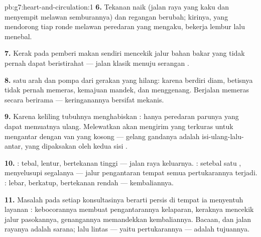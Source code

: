 \begin{solution}{pb:g7:heart-and-circulation:1}
\textbf{6.} Tekanan  naik (jalan raya yang kaku dan menyempit
melawan semburannya) dan regangan   berubah; 
kirinya, yang mendorong tiap ronde melawan peredaran yang mengaku,
bekerja lembur lalu menebal.

\textbf{7.} Kerak pada  pemberi makan  sendiri
mencekik jalur bahan bakar  yang tidak pernah dapat beristirahat
--- jalan klasik menuju serangan .

\textbf{8.}  satu arah  dan pompa  dari gerakan yang
hilang: karena berdiri diam, betisnya tidak pernah memeras,
kemajuan  mandek, dan  menggenang.
Berjalan memeras  secara berirama --- keringanannya bersifat
mekanis.

\textbf{9.} Karena keliling tubuhnya menghabiskan  :
hanya peredaran parunya yang dapat memuatnya ulang. Melewatkan
 akan mengirim  yang terkuras untuk mengantar dengan
van yang kosong --- gelang gandanya adalah isi-ulang-lalu-antar, yang
dipaksakan oleh kedua sisi .

\textbf{10.} : tebal, lentur, bertekanan tinggi --- jalan raya
keluarnya. : setebal satu , menyelusupi segalanya --- jalur
pengantaran tempat semua pertukarannya terjadi. : lebar, berkatup,
bertekanan rendah --- kembaliannya.

\textbf{11.} Masalah pada setiap konsultasinya berarti persis di
tempat ia menyentuh layanan : kebocorannya membuat
pengantarannya kelaparan, keraknya mencekik jalur pasokannya,
genangannya memandekkan kembaliannya. Bacaan,  dan jalan rayanya
adalah sarana; lalu lintas  --- yaitu pertukarannya ---
adalah tujuannya.


\end{solution}
